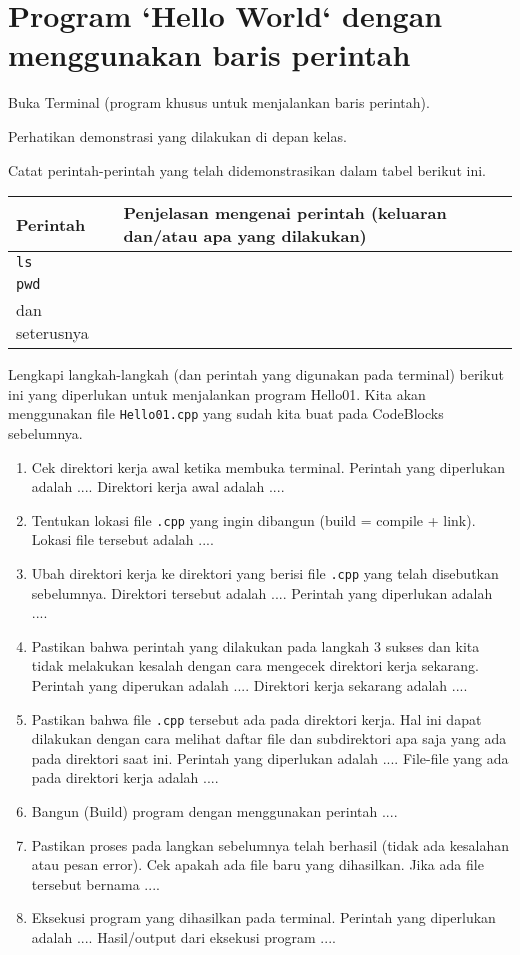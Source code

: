 \documentclass[a4paper,11pt]{extarticle}
\begin{document}
\section{Program `Hello World` dengan menggunakan baris perintah}

Buka Terminal (program khusus untuk menjalankan baris perintah).

Perhatikan demonstrasi yang dilakukan di depan kelas.

Catat perintah-perintah yang telah didemonstrasikan dalam tabel berikut ini.

{\centering
\begin{tabular}{|p{}|p{}|}
\hline
Perintah & Penjelasan mengenai perintah (keluaran dan/atau apa yang dilakukan) \\
\hline
\texttt{ls} & \\
\texttt{pwd} & \\
dan seterusnya & \\
\hline
\end{tabular}
}

Lengkapi langkah-langkah (dan perintah yang digunakan pada terminal) berikut ini yang
diperlukan untuk menjalankan program \textsf{Hello01}. Kita akan menggunakan
file \texttt{Hello01.cpp} yang sudah kita buat pada CodeBlocks sebelumnya.

\begin{enumerate}
\item Cek direktori kerja awal ketika membuka terminal.
   Perintah yang diperlukan adalah ....
   Direktori kerja awal adalah ....
%
\item Tentukan lokasi file \texttt{.cpp} yang ingin dibangun
   (\textsf{build = compile + link}). Lokasi file tersebut adalah ....
%
\item Ubah direktori kerja ke direktori yang berisi file \texttt{.cpp} yang telah
   disebutkan sebelumnya.
   Direktori tersebut adalah ....
   Perintah yang diperlukan adalah ....
%
\item Pastikan bahwa perintah yang dilakukan pada langkah 3 sukses dan kita
   tidak melakukan kesalah dengan cara mengecek direktori kerja sekarang.
   Perintah yang diperukan adalah ....
   Direktori kerja sekarang adalah ....
%
\item Pastikan bahwa file \texttt{.cpp} tersebut ada pada direktori kerja.
   Hal ini dapat dilakukan dengan cara melihat daftar file dan subdirektori apa
   saja yang ada pada direktori saat ini.
   Perintah yang diperlukan adalah ....
   File-file yang ada pada direktori kerja adalah ....
%
\item Bangun (\textsf{Build}) program dengan menggunakan perintah ....
%
\item Pastikan proses pada langkan sebelumnya telah berhasil (tidak ada kesalahan atau pesan error).
   Cek apakah ada file baru yang dihasilkan.
   Jika ada file tersebut bernama ....
%
\item Eksekusi program yang dihasilkan pada terminal.
   Perintah yang diperlukan adalah ....
   Hasil/output dari eksekusi program
   ....
\end{enumerate}
\end{document}
